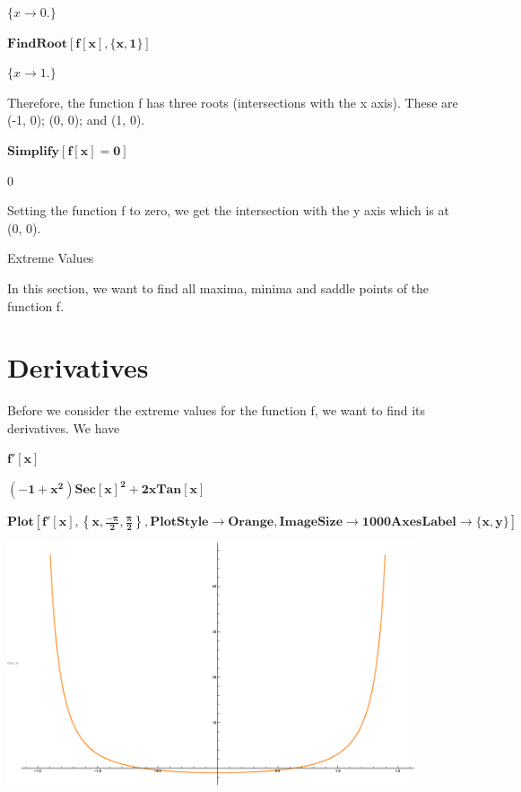 \documentclass{article}
\begin{document}
\begin{doublespace}
\noindent\(\{x\to 0.\}\)
\end{doublespace}

\begin{doublespace}
\noindent\(\pmb{\text{FindRoot}[f[x],\{x,1\}]}\)
\end{doublespace}

\begin{doublespace}
\noindent\(\{x\to 1.\}\)
\end{doublespace}

Therefore, the function f has three roots (intersections with the x axis). These are (-1, 0); (0, 0); and (1, 0).

\begin{doublespace}
\noindent\(\pmb{\text{Simplify}[f[x]=0]}\)
\end{doublespace}

\begin{doublespace}
\noindent\(0\)
\end{doublespace}

Setting the function f to zero, we get the intersection with the y axis which is at (0, 0).

Extreme Values

In this section, we want to find all maxima, minima and saddle points of the function f.

\section*{Derivatives}

Before we consider the extreme values for the function f, we want to find its derivatives. We have

\begin{doublespace}
\noindent\(\pmb{f'[x]}\)
\end{doublespace}

\begin{doublespace}
\noindent\(\pmb{\left(-1+x^2\right) \text{Sec}[x]^2+2 x \text{Tan}[x]}\)
\end{doublespace}

\begin{doublespace}
\noindent\(\pmb{\text{Plot}\left[f'[x],\left\{x,\frac{-\pi }{2},\frac{\pi }{2}\right\},\text{PlotStyle}\to \text{Orange}, \text{ImageSize}\to 1000\text{AxesLabel}\to
\{x,y\}\right]}\)
\end{doublespace}

\includegraphics[width=0.9\textwidth]{curve_tracing_09_gr2.eps}
\end{document}

